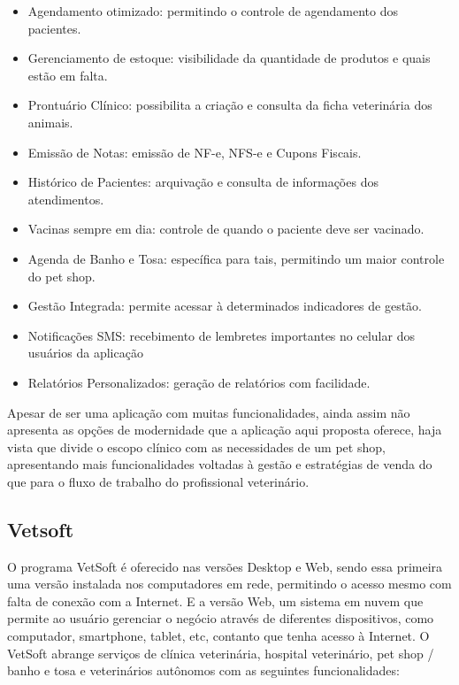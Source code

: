 \documentclass[
    12pt,               %
    openright,          %
    oneside,
    a4paper,            %
    BIBLATEX,           %
    TODO,               %
    english,            %
    brazil              %
    ]{ifsp-spo-inf-ctds}
\begin{document}
\begin{itemize}
    \item Agendamento otimizado: permitindo o controle de agendamento dos pacientes.
    \item Gerenciamento de estoque: visibilidade da quantidade de produtos e quais estão em falta.
    \item Prontuário Clínico: possibilita a criação e consulta da ficha veterinária dos animais.
    \item Emissão de Notas: emissão de NF-e, NFS-e e Cupons Fiscais.
    \item Histórico de Pacientes: arquivação e consulta de informações dos atendimentos. 
    \item Vacinas sempre em dia: controle de quando o paciente deve ser vacinado.
    \item Agenda de Banho e Tosa: específica para tais, permitindo um maior controle do pet shop.
    \item Gestão Integrada: permite acessar à determinados indicadores de gestão.
    \item Notificações SMS: recebimento de lembretes importantes no celular dos usuários da aplicação
    \item Relatórios Personalizados: geração de relatórios com facilidade.
\end{itemize}

Apesar de ser uma aplicação com muitas funcionalidades, ainda assim não apresenta as opções de modernidade que a aplicação aqui proposta oferece, haja vista que divide o escopo clínico com as necessidades de um pet shop, apresentando mais funcionalidades voltadas à gestão e estratégias de venda do que para o fluxo de trabalho do profissional veterinário.

\subsection{Vetsoft}
O programa VetSoft é oferecido nas versões Desktop e Web, sendo essa primeira uma versão instalada nos computadores em rede, permitindo o acesso mesmo com falta de conexão com a Internet. E a versão Web, um sistema em nuvem que permite ao usuário gerenciar o negócio através de diferentes dispositivos, como computador, smartphone, tablet, etc, contanto que tenha acesso à Internet. O VetSoft abrange serviços de clínica veterinária, hospital veterinário, pet shop / banho e tosa e veterinários autônomos com as seguintes funcionalidades:
\end{document}
